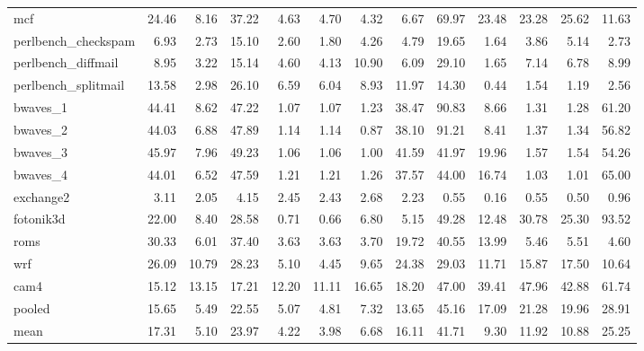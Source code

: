 \documentclass[10pt,a4paper]{article}
\begin{document}
{\begin{longtable}{@{}lrrrrrrrrrrrr@{}}
mcf & 24.46 & 8.16 & 37.22 & 4.63 & 4.70 & 4.32 & 6.67 & 69.97 & 23.48 & 23.28 & 25.62 & 11.63 \\
perlbench\_checkspam & 6.93 & 2.73 & 15.10 & 2.60 & 1.80 & 4.26 & 4.79 & 19.65 & 1.64 & 3.86 & 5.14 & 2.73 \\
perlbench\_diffmail & 8.95 & 3.22 & 15.14 & 4.60 & 4.13 & 10.90 & 6.09 & 29.10 & 1.65 & 7.14 & 6.78 & 8.99 \\
perlbench\_splitmail & 13.58 & 2.98 & 26.10 & 6.59 & 6.04 & 8.93 & 11.97 & 14.30 & 0.44 & 1.54 & 1.19 & 2.56 \\
bwaves\_1 & 44.41 & 8.62 & 47.22 & 1.07 & 1.07 & 1.23 & 38.47 & 90.83 & 8.66 & 1.31 & 1.28 & 61.20 \\
bwaves\_2 & 44.03 & 6.88 & 47.89 & 1.14 & 1.14 & 0.87 & 38.10 & 91.21 & 8.41 & 1.37 & 1.34 & 56.82 \\
bwaves\_3 & 45.97 & 7.96 & 49.23 & 1.06 & 1.06 & 1.00 & 41.59 & 41.97 & 19.96 & 1.57 & 1.54 & 54.26 \\
bwaves\_4 & 44.01 & 6.52 & 47.59 & 1.21 & 1.21 & 1.26 & 37.57 & 44.00 & 16.74 & 1.03 & 1.01 & 65.00 \\
exchange2 & 3.11 & 2.05 & 4.15 & 2.45 & 2.43 & 2.68 & 2.23 & 0.55 & 0.16 & 0.55 & 0.50 & 0.96 \\
fotonik3d & 22.00 & 8.40 & 28.58 & 0.71 & 0.66 & 6.80 & 5.15 & 49.28 & 12.48 & 30.78 & 25.30 & 93.52 \\
roms & 30.33 & 6.01 & 37.40 & 3.63 & 3.63 & 3.70 & 19.72 & 40.55 & 13.99 & 5.46 & 5.51 & 4.60 \\
wrf & 26.09 & 10.79 & 28.23 & 5.10 & 4.45 & 9.65 & 24.38 & 29.03 & 11.71 & 15.87 & 17.50 & 10.64 \\
cam4 & 15.12 & 13.15 & 17.21 & 12.20 & 11.11 & 16.65 & 18.20 & 47.00 & 39.41 & 47.96 & 42.88 & 61.74 \\
\midrule
pooled & 15.65 & 5.49 & 22.55 & 5.07 & 4.81 & 7.32 & 13.65 & 45.16 & 17.09 & 21.28 & 19.96 & 28.91 \\
mean & 17.31 & 5.10 & 23.97 & 4.22 & 3.98 & 6.68 & 16.11 & 41.71 & 9.30 & 11.92 & 10.88 & 25.25 \\
\end{longtable}
}
\end{document}
